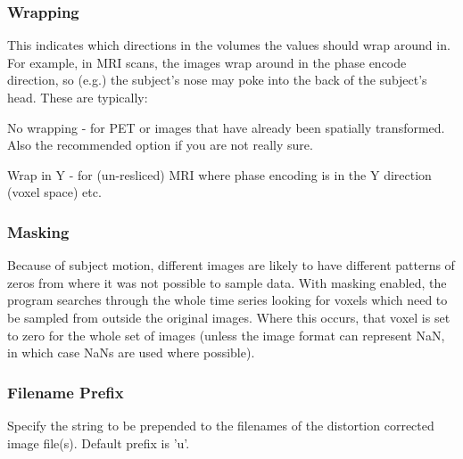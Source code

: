 \subsubsection{Wrapping}
This indicates which directions in the volumes the values should wrap around in.  For example, in MRI scans, the images wrap around in the phase encode direction, so (e.g.) the subject's nose may poke into the back of the subject's head. These are typically:

    No wrapping - for PET or images that have already                   been spatially transformed. Also the recommended option if                   you are not really sure.

    Wrap in  Y  - for (un-resliced) MRI where phase encoding                   is in the Y direction (voxel space) etc.


\subsubsection{Masking}
Because of subject motion, different images are likely to have different patterns of zeros from where it was not possible to sample data. With masking enabled, the program searches through the whole time series looking for voxels which need to be sampled from outside the original images. Where this occurs, that voxel is set to zero for the whole set of images (unless the image format can represent NaN, in which case NaNs are used where possible).


\subsubsection{Filename Prefix}
Specify the string to be prepended to the filenames of the distortion corrected image file(s). Default prefix is 'u'.

